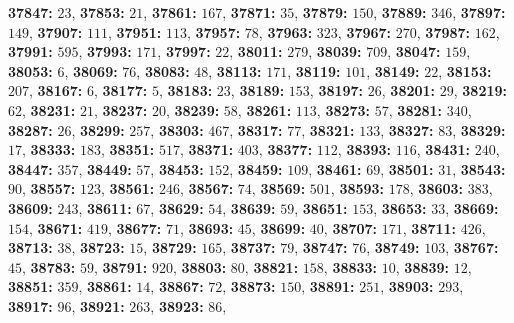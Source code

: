 \textsf{\bfseries 37847:} $23$, \textsf{\bfseries 37853:} $21$, \textsf{\bfseries 37861:} $167$, \textsf{\bfseries 37871:} $35$, \textsf{\bfseries 37879:} $150$, \textsf{\bfseries 37889:} $346$, \textsf{\bfseries 37897:} $149$, \textsf{\bfseries 37907:} $111$, \textsf{\bfseries 37951:} $113$, \textsf{\bfseries 37957:} $78$, \textsf{\bfseries 37963:} $323$, \textsf{\bfseries 37967:} $270$, \textsf{\bfseries 37987:} $162$, \textsf{\bfseries 37991:} $595$, \textsf{\bfseries 37993:} $171$, \textsf{\bfseries 37997:} $22$, \textsf{\bfseries 38011:} $279$, \textsf{\bfseries 38039:} $709$, \textsf{\bfseries 38047:} $159$, \textsf{\bfseries 38053:} $6$, \textsf{\bfseries 38069:} $76$, \textsf{\bfseries 38083:} $48$, \textsf{\bfseries 38113:} $171$, \textsf{\bfseries 38119:} $101$, \textsf{\bfseries 38149:} $22$, \textsf{\bfseries 38153:} $207$, \textsf{\bfseries 38167:} $6$, \textsf{\bfseries 38177:} $5$, \textsf{\bfseries 38183:} $23$, \textsf{\bfseries 38189:} $153$, \textsf{\bfseries 38197:} $26$, \textsf{\bfseries 38201:} $29$, \textsf{\bfseries 38219:} $62$, \textsf{\bfseries 38231:} $21$, \textsf{\bfseries 38237:} $20$, \textsf{\bfseries 38239:} $58$, \textsf{\bfseries 38261:} $113$, \textsf{\bfseries 38273:} $57$, \textsf{\bfseries 38281:} $340$, \textsf{\bfseries 38287:} $26$, \textsf{\bfseries 38299:} $257$, \textsf{\bfseries 38303:} $467$, \textsf{\bfseries 38317:} $77$, \textsf{\bfseries 38321:} $133$, \textsf{\bfseries 38327:} $83$, \textsf{\bfseries 38329:} $17$, \textsf{\bfseries 38333:} $183$, \textsf{\bfseries 38351:} $517$, \textsf{\bfseries 38371:} $403$, \textsf{\bfseries 38377:} $112$, \textsf{\bfseries 38393:} $116$, \textsf{\bfseries 38431:} $240$, \textsf{\bfseries 38447:} $357$, \textsf{\bfseries 38449:} $57$, \textsf{\bfseries 38453:} $152$, \textsf{\bfseries 38459:} $109$, \textsf{\bfseries 38461:} $69$, \textsf{\bfseries 38501:} $31$, \textsf{\bfseries 38543:} $90$, \textsf{\bfseries 38557:} $123$, \textsf{\bfseries 38561:} $246$, \textsf{\bfseries 38567:} $74$, \textsf{\bfseries 38569:} $501$, \textsf{\bfseries 38593:} $178$, \textsf{\bfseries 38603:} $383$, \textsf{\bfseries 38609:} $243$, \textsf{\bfseries 38611:} $67$, \textsf{\bfseries 38629:} $54$, \textsf{\bfseries 38639:} $59$, \textsf{\bfseries 38651:} $153$, \textsf{\bfseries 38653:} $33$, \textsf{\bfseries 38669:} $154$, \textsf{\bfseries 38671:} $419$, \textsf{\bfseries 38677:} $71$, \textsf{\bfseries 38693:} $45$, \textsf{\bfseries 38699:} $40$, \textsf{\bfseries 38707:} $171$, \textsf{\bfseries 38711:} $426$, \textsf{\bfseries 38713:} $38$, \textsf{\bfseries 38723:} $15$, \textsf{\bfseries 38729:} $165$, \textsf{\bfseries 38737:} $79$, \textsf{\bfseries 38747:} $76$, \textsf{\bfseries 38749:} $103$, \textsf{\bfseries 38767:} $45$, \textsf{\bfseries 38783:} $59$, \textsf{\bfseries 38791:} $920$, \textsf{\bfseries 38803:} $80$, \textsf{\bfseries 38821:} $158$, \textsf{\bfseries 38833:} $10$, \textsf{\bfseries 38839:} $12$, \textsf{\bfseries 38851:} $359$, \textsf{\bfseries 38861:} $14$, \textsf{\bfseries 38867:} $72$, \textsf{\bfseries 38873:} $150$, \textsf{\bfseries 38891:} $251$, \textsf{\bfseries 38903:} $293$, \textsf{\bfseries 38917:} $96$, \textsf{\bfseries 38921:} $263$, \textsf{\bfseries 38923:} $86$, 
